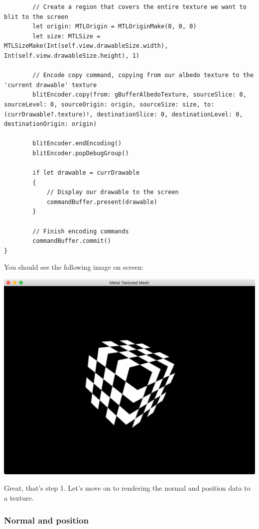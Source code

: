 \documentclass[11pt]{article}
\begin{document}
\begin{verbatim}
        // Create a region that covers the entire texture we want to blit to the screen
        let origin: MTLOrigin = MTLOriginMake(0, 0, 0)
        let size: MTLSize = MTLSizeMake(Int(self.view.drawableSize.width), Int(self.view.drawableSize.height), 1)

        // Encode copy command, copying from our albedo texture to the 'current drawable' texture
        blitEncoder.copy(from: gBufferAlbedoTexture, sourceSlice: 0, sourceLevel: 0, sourceOrigin: origin, sourceSize: size, to: (currDrawable?.texture)!, destinationSlice: 0, destinationLevel: 0, destinationOrigin: origin)

        blitEncoder.endEncoding()
        blitEncoder.popDebugGroup()

        if let drawable = currDrawable
        {
            // Display our drawable to the screen
            commandBuffer.present(drawable)
        }

        // Finish encoding commands
        commandBuffer.commit()
}
\end{verbatim}

You should see the following image on screen:

\begin{center}
\includegraphics[width=.9\linewidth]{../img/posts/implementing-deferred-shading-in-metal/albedo.png}
\end{center}

Great, that's step 1. Let's move on to rendering the normal and position data to
a texture.

\subsubsection*{Normal and position}
\label{sec:org03a5dc4}
\end{document}
